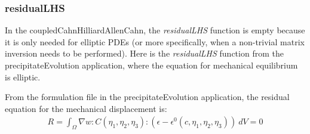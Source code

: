 \documentclass[10pt]{article} %
\begin{document}
\subsubsection{residualLHS}
In the coupledCahnHilliardAllenCahn, the \emph{residualLHS} function is empty because it is only needed for elliptic PDEs (or more specifically, when a non-trivial matrix inversion needs to be performed). Here is the \emph{residualLHS} function from the precipitateEvolution application, where the equation for mechanical equilibrium is elliptic.

From the formulation file in the precipitateEvolution application, the residual equation for the mechanical displacement is:
\begin{gather}
R =  \int_{\Omega}   \nabla w :  C(\eta_1, \eta_2, \eta_3) : \left( \epsilon - \epsilon^0(c,\eta_1, \eta_2, \eta_3)\right) ~dV = 0 
\end{gather}
\end{document}
